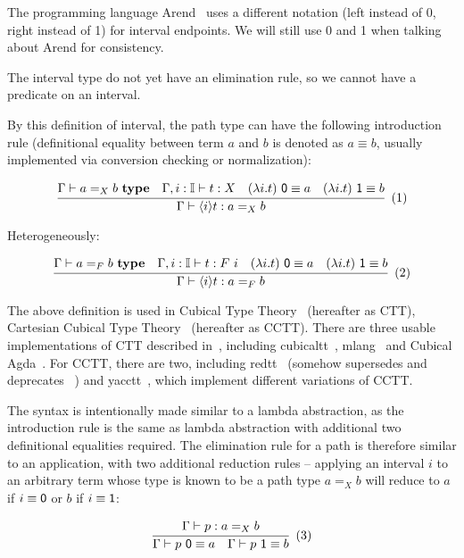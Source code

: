 The programming language Arend~\cite{Arend} uses a different notation
(\textsf{left} instead of \textsf 0, \textsf{right} instead of \textsf 1)
for interval endpoints.
We will still use \textsf 0 and \textsf 1 when talking
about Arend for consistency.

The interval type do not yet have an elimination rule,
so we cannot have a predicate on an interval.

By this definition of interval, the path type can
have the following introduction rule
(definitional equality between term $a$ and $b$
is denoted as $a \equiv b$,
usually implemented via conversion checking or normalization):

\[
  \cfrac{
    \Gamma \vdash a =_X b \ \textbf{type}
    \quad
    \Gamma, i : \mathbb I \vdash t : X
    \quad
    (\lambda i. t) \ \textsf 0 \equiv a
    \quad
    (\lambda i. t) \ \textsf 1 \equiv b
  }{
    \Gamma \vdash \lrangle i t : a =_X b
  }
  \xtag
\]

Heterogeneously:

\[
  \cfrac{
    \Gamma \vdash a =_F b \ \textbf{type}
    \quad
    \Gamma, i : \mathbb I \vdash t : F \ i
    \quad
    (\lambda i. t) \ \textsf 0 \equiv a
    \quad
    (\lambda i. t) \ \textsf 1 \equiv b
  }{
    \Gamma \vdash \lrangle i t : a =_F b
  }
  \xtag
\]

The above definition is used in Cubical Type Theory~\cite{CCHM,CHM}
(hereafter as CTT), Cartesian Cubical Type
Theory~\cite{CCTT,CCTT2,CHTT} (hereafter as CCTT).
There are three usable implementations of CTT described in~\cite{CHM},
including cubicaltt~\cite{CubicalTT},
mlang~\cite{Mlang} and Cubical Agda~\cite{CubicalAgda}.
For CCTT, there are two, including
redtt~\cite{RedTT} (somehow supersedes and deprecates
\RedPRL~\cite{RedPRL}) and yacctt~\cite{YaccTT},
which implement different variations of CCTT.

The syntax is intentionally made similar to a lambda abstraction,
as the introduction rule is the same as lambda abstraction with
additional two definitional equalities required.
The elimination rule for a path is therefore similar to an application,
with two additional reduction rules -- applying an interval $i$ to
an arbitrary term whose type is known to be a path type $a =_X b$
will reduce to $a$ if $i \equiv \textsf 0$ or $b$ if $i \equiv \textsf 1$:

\[
  \cfrac{
    \Gamma \vdash p : a =_X b
  }{
    \Gamma \vdash p\ \textsf 0 \equiv a
    \quad
    \Gamma \vdash p\ \textsf 1 \equiv b
  }
  \xtag \label{eqn:path-app}
\]

